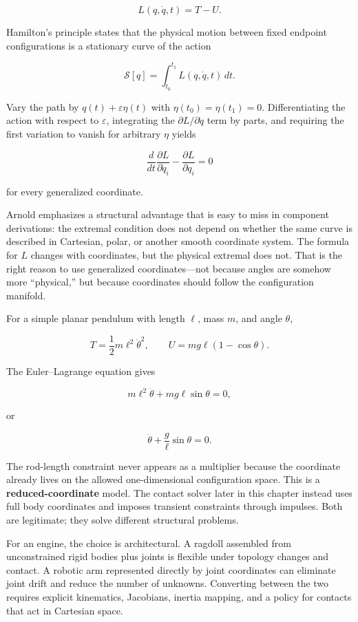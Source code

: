 \[
L(q,\dot q,t)=T-U.
\]

Hamilton's principle states that the physical motion between fixed endpoint configurations is a stationary curve of the action

\[
\mathcal S[q]
=
\int_{t_0}^{t_1}
L(q,\dot q,t)\,dt.
\]

Vary the path by \(q(t)+\varepsilon\eta(t)\) with \(\eta(t_0)=\eta(t_1)=0\). Differentiating the action with respect to \(\varepsilon\), integrating the \(\partial L/\partial\dot q\) term by parts, and requiring the first variation to vanish for arbitrary \(\eta\) yields

\[
\boxed{
\frac{d}{dt}
\frac{\partial L}{\partial\dot q_i}
-
\frac{\partial L}{\partial q_i}
=
0
}
\]

for every generalized coordinate.

Arnold emphasizes a structural advantage that is easy to miss in component derivations: the extremal condition does not depend on whether the same curve is described in Cartesian, polar, or another smooth coordinate system. The formula for \(L\) changes with coordinates, but the physical extremal does not. That is the right reason to use generalized coordinates---not because angles are somehow more ``physical,'' but because coordinates should follow the configuration manifold.

For a simple planar pendulum with length \(\ell\), mass \(m\), and angle \(\theta\),

\[
T=\frac12m\ell^2\dot\theta^2,
\qquad
U=mg\ell(1-\cos\theta).
\]

The Euler--Lagrange equation gives

\[
m\ell^2\ddot\theta
+
mg\ell\sin\theta
=
0,
\]

or

\[
\ddot\theta+\frac{g}{\ell}\sin\theta=0.
\]

The rod-length constraint never appears as a multiplier because the coordinate already lives on the allowed one-dimensional configuration space. This is a \textbf{reduced-coordinate} model. The contact solver later in this chapter instead uses full body coordinates and imposes transient constraints through impulses. Both are legitimate; they solve different structural problems.

For an engine, the choice is architectural. A ragdoll assembled from unconstrained rigid bodies plus joints is flexible under topology changes and contact. A robotic arm represented directly by joint coordinates can eliminate joint drift and reduce the number of unknowns. Converting between the two requires explicit kinematics, Jacobians, inertia mapping, and a policy for contacts that act in Cartesian space.

